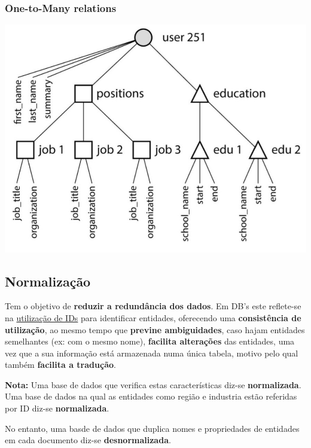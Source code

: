 \documentclass{article}
\begin{document}
\pagebreak

\subsubsection{One-to-Many relations}

\begin{center}
  \includegraphics[scale=0.2]{5}
\end{center}

\subsection{Normalização}

Tem o objetivo de \textbf{reduzir a redundância dos dados}.
Em DB's este reflete-se na \uline{utilização de IDs} para identificar entidades,
oferecendo uma \textbf{consistência de utilização}, ao mesmo tempo que
\textbf{previne ambiguidades}, caso hajam entidades semelhantes (ex: com o mesmo nome),
\textbf{facilita alterações} das entidades, uma vez que a sua informação está armazenada
numa única tabela, motivo pelo qual também \textbf{facilita a tradução}.

\begin{flushleft}
  \textbf{Nota:} Uma base de dados que verifica estas características diz-se \textbf{normalizada}.
  Uma base de dados na qual as entidades como região e industria estão referidas
  por ID diz-se \textbf{normalizada}.

  No entanto, uma basde de dados que duplica nomes e propriedades de entidades
  em cada documento diz-se \textbf{desnormalizada}.
\end{flushleft}
\end{document}
